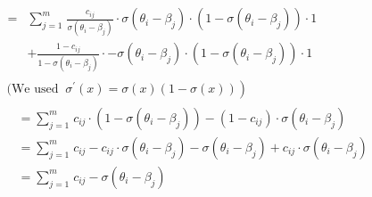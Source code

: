 \[\begin{aligned}
 & \begin{matrix}
 & \\
 & \\
 = & \sum_{j = 1}^{m}\mspace{2mu}\frac{c_{ij}}{\sigma\left( \theta_{i} - \beta_{j} \right)} \cdot \sigma\left( \theta_{i} - \beta_{j} \right) \cdot \left( 1 - \sigma\left( \theta_{i} - \beta_{j} \right) \right) \cdot 1 \\
 & + \frac{1 - c_{ij}}{1 - \sigma\left( \theta_{i} - \beta_{j} \right)} \cdot - \sigma\left( \theta_{i} - \beta_{j} \right) \cdot \left( 1 - \sigma\left( \theta_{i} - \beta_{j} \right) \right) \cdot 1
\end{matrix} \\
 & \text{ (We used }\left. \ \sigma^{'}(x) = \sigma(x)(1 - \sigma(x)) \right) \\
 & \begin{matrix}
 & = \sum_{j = 1}^{m}\mspace{2mu} c_{ij} \cdot \left( 1 - \sigma\left( \theta_{i} - \beta_{j} \right) \right) - \left( 1 - c_{ij} \right) \cdot \sigma\left( \theta_{i} - \beta_{j} \right) \\
 & = \sum_{j = 1}^{m}\mspace{2mu} c_{ij} - c_{ij} \cdot \sigma\left( \theta_{i} - \beta_{j} \right) - \sigma\left( \theta_{i} - \beta_{j} \right) + c_{ij} \cdot \sigma\left( \theta_{i} - \beta_{j} \right) \\
 & = \sum_{j = 1}^{m}\mspace{2mu} c_{ij} - \sigma\left( \theta_{i} - \beta_{j} \right)
\end{matrix}
\end{aligned}\]

